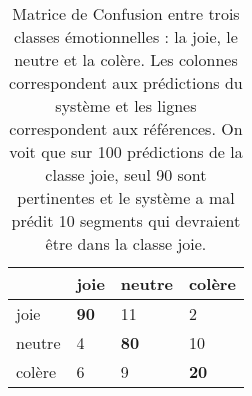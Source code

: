 \begin{table}[h]
  \centering
\begin{tabular}{|l|l|l|l|}
\hline
       & joie        & neutre      & colère      \\ \hline
joie   & \textbf{90} & 11          & 2           \\ \hline
neutre & 4           & \textbf{80} & 10          \\ \hline
colère & 6           & 9           & \textbf{20} \\ \hline
\end{tabular}
\caption{Matrice de Confusion entre trois classes émotionnelles : la joie, le neutre et la colère. Les colonnes correspondent aux prédictions du système et les lignes correspondent aux références. On voit que sur 100 prédictions de la classe joie, seul 90 sont pertinentes et le système a mal prédit 10 segments qui devraient être dans la classe joie.}
\label{tab:matriceConf}
\end{table}

